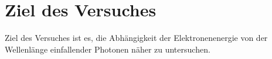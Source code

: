 \section{Ziel des Versuches}
\label{sec:versuchsziel}

Ziel des Versuches ist es, die Abhängigkeit der Elektronenenergie
von der Wellenlänge einfallender Photonen näher zu untersuchen.
